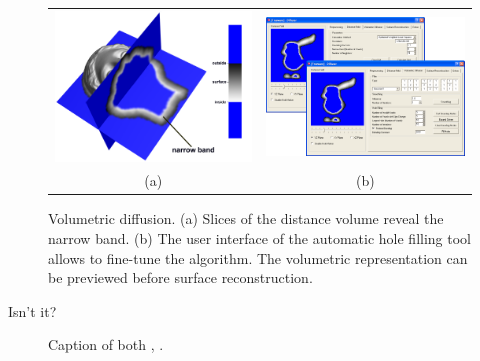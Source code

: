 \begin{figure}
    \centering
    \setlength{\tabcolsep}{0.0130\linewidth}
    \begin{tabular}{@{}cc@{}}
    \includegraphics[width=0.487\linewidth]{figures/IgeaNarrowBand}&
    \includegraphics[width=0.487\linewidth]{figures/voldiff_ui}\\
    (a)&(b)\\
    \end{tabular}
    \caption[Volumetric diffusion]{Volumetric diffusion.
    	  \textup{(a)} Slices of the distance volume reveal the narrow band.
			  \textup{(b)} The user interface of the automatic hole filling
        tool allows to fine-tune the algorithm.
        The volumetric representation can be previewed before
        surface reconstruction.%
      \label{fig:voldiff}}
\end{figure}
%
Isn't it?

\begin{figure}[!htb]
	\centering
	 \hfill
	\caption[Caption both]{Caption of both , .}
	\label{fig:bothfigures}
\end{figure}


